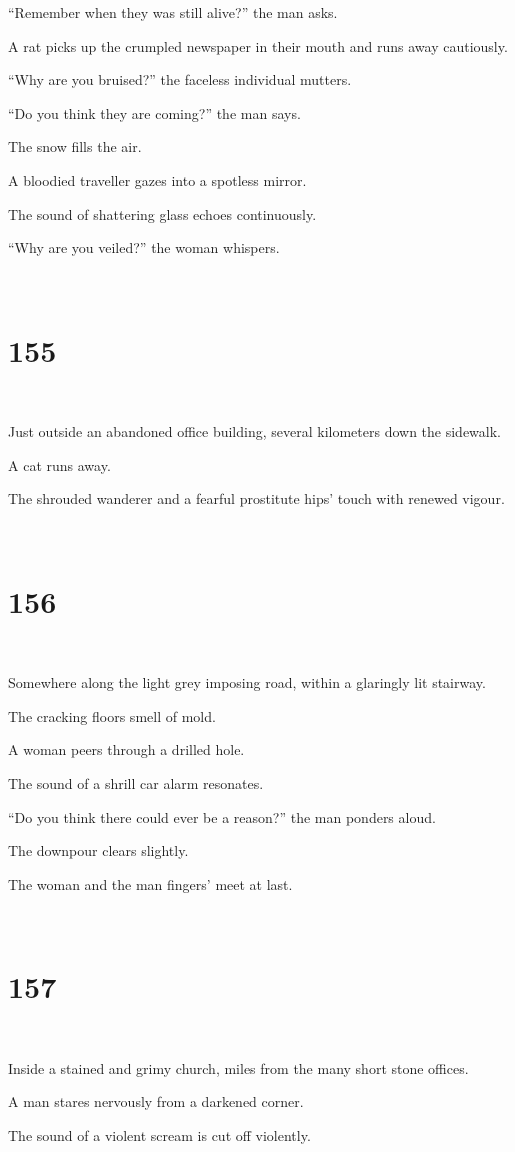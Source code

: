 \documentclass{report}
\begin{document}
``Remember when they was still alive?'' the man asks.

A rat picks up the crumpled newspaper in their mouth and runs away cautiously.

``Why are you bruised?'' the faceless individual mutters.

``Do you think they are coming?'' the man says.

The snow fills the air.

A bloodied traveller gazes into a spotless mirror.

The sound of shattering glass echoes continuously.

``Why are you veiled?'' the woman whispers.

~
\chapter*{155}
~

Just outside an abandoned office building, several kilometers down the sidewalk.

A cat runs away.

The shrouded wanderer and a fearful prostitute hips' touch with renewed vigour.

~
\chapter*{156}
~

Somewhere along the light grey imposing road, within a glaringly lit stairway.

The cracking floors smell of mold.

A woman peers through a drilled hole.

The sound of a shrill car alarm resonates.

``Do you think there could ever be a reason?'' the man ponders aloud.

The downpour clears slightly.

The woman and the man fingers' meet at last.

~
\chapter*{157}
~

Inside a stained and grimy church, miles from the many short stone offices.

A man stares nervously from a darkened corner.

The sound of a violent scream is cut off violently.
\end{document}
